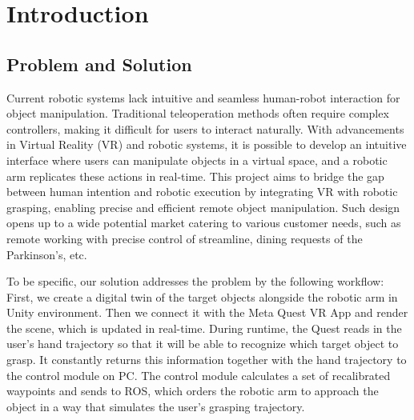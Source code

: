 \documentclass{senior-design}
\begin{document}
\generalreportcover %
\frontmatter
\tableofcontents

\mainmatter
\chapter{Introduction}
\section{Problem and Solution}
Current robotic systems lack intuitive and seamless human-robot interaction for object manipulation. Traditional teleoperation methods often require complex controllers, making it difficult for users to interact naturally. With advancements in Virtual Reality (VR) and robotic systems, it is possible to develop an intuitive interface where users can manipulate objects in a virtual space, and a robotic arm replicates these actions in real-time. This project aims to bridge the gap between human intention and robotic execution by integrating VR with robotic grasping, enabling precise and efficient remote object manipulation. Such design opens up to a wide potential market catering to various customer needs, such as remote working with precise control of streamline, dining requests of the Parkinson’s, etc. 
 
To be specific, our solution addresses the problem by the following workflow: First, we create a digital twin of the target objects alongside the robotic arm in Unity environment. Then we connect it with the Meta Quest VR App and render the scene, which is updated in real-time. During runtime, the Quest reads in the user’s hand trajectory so that it will be able to recognize which target object to grasp. It constantly returns this information together with the hand trajectory to the control module on PC. The control module calculates a set of recalibrated waypoints and sends to ROS, which orders the robotic arm to approach the object in a way that simulates the user’s grasping trajectory. 
\end{document}
